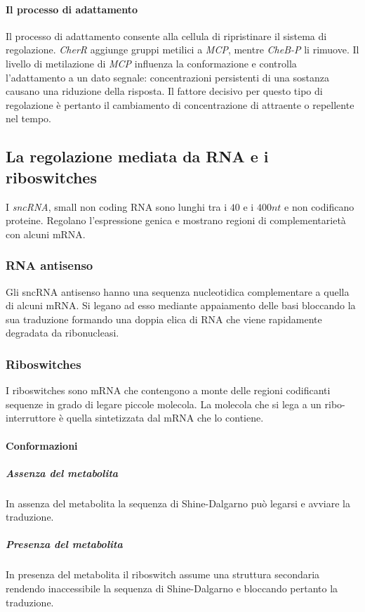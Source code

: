 			\paragraph{Il processo di adattamento}
			Il processo di adattamento consente alla cellula di ripristinare il sistema di regolazione.
			\emph{CherR} aggiunge gruppi metilici a \emph{MCP}, mentre \emph{CheB-P} li rimuove.
			Il livello di metilazione di \emph{MCP} influenza la conformazione e controlla l'adattamento a un dato segnale: concentrazioni persistenti di una sostanza causano una riduzione della risposta.
			Il fattore decisivo per questo tipo di regolazione \`e pertanto il cambiamento di concentrazione di attraente o repellente nel tempo.

	\subsection{La regolazione mediata da RNA e i riboswitches}
	I \emph{sncRNA}, small non coding RNA sono lunghi tra i $40$ e i $400nt$ e non codificano proteine.
	Regolano l'espressione genica e mostrano regioni di complementariet\`a con alcuni mRNA.

		\subsubsection{RNA antisenso}
		Gli sncRNA antisenso hanno una sequenza nucleotidica complementare a quella di alcuni mRNA.
		Si legano ad esso mediante appaiamento delle basi bloccando la sua traduzione formando una doppia elica di RNA che viene rapidamente degradata da ribonucleasi.

		\subsubsection{Riboswitches}
		I riboswitches sono mRNA che contengono a monte delle regioni codificanti sequenze in grado di legare piccole molecola.
		La molecola che si lega a un ribo-interruttore \`e quella sintetizzata dal mRNA che lo contiene.

			\paragraph{Conformazioni}

				\subparagraph{Assenza del metabolita}
				In assenza del metabolita la sequenza di Shine-Dalgarno pu\`o legarsi e avviare la traduzione.

				\subparagraph{Presenza del metabolita}
				In presenza del metabolita il riboswitch assume una struttura secondaria rendendo inaccessibile la sequenza di Shine-Dalgarno e bloccando pertanto la traduzione.
